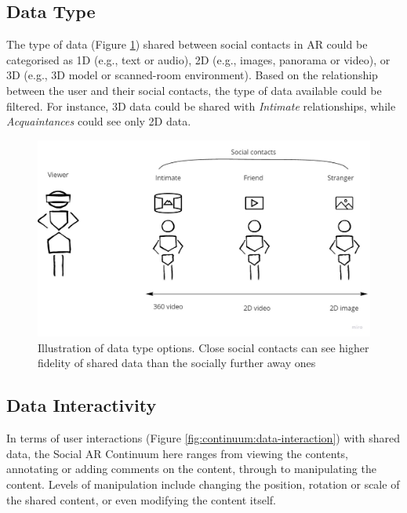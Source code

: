 


\subsection{Data Type}

The type of data (Figure \ref{fig:continuum:data-type}) shared between social contacts in AR could be categorised as 1D (e.g., text or audio), 2D (e.g., images, panorama or video), or 3D (e.g., 3D model or scanned-room environment). Based on the relationship between the user and their social contacts, the type of data available could be filtered. For instance, 3D data could be shared with \textit{Intimate} relationships, while \textit{Acquaintances} could see only 2D data.  

\begin{figure}[h]
    \centering
    \includegraphics[width=0.8\linewidth]{images/30-continuum/Continuum-Data-type.jpg}
    \caption{Illustration of data type options. Close social contacts can see higher fidelity of shared data than the socially further away ones}
    \label{fig:continuum:data-type}
\end{figure}

\subsection{Data Interactivity}

In terms of user interactions (Figure \ref{fig:continuum:data-interaction}) with shared data, the Social AR Continuum here ranges from viewing the contents, annotating or adding comments on the content, through to manipulating the content. Levels of manipulation include changing the position, rotation or scale of the shared content, or even modifying the content itself.

